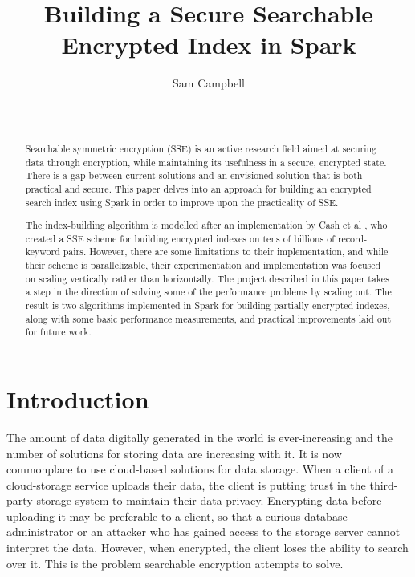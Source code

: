 \documentclass{sig-alternate-05-2015}
\begin{document}

\title{Building a Secure Searchable Encrypted Index in Spark}
\author{
\alignauthor
Sam Campbell\\
       \\
       \\
}


\maketitle
\begin{abstract}
Searchable symmetric encryption (SSE) is an active research field aimed at securing data through encryption, while maintaining its usefulness in a secure, encrypted state. There is a gap between current solutions and an envisioned solution that is both practical and secure. This paper delves into an approach for building an encrypted search index using Spark in order to improve upon the practicality of SSE.

The index-building algorithm is modelled after an implementation by Cash et al \cite{davidcashetal.2014}, who created a SSE scheme for building encrypted indexes on tens of billions of record-keyword pairs. However, there are some limitations to their implementation, and while their scheme is parallelizable, their experimentation and implementation was focused on scaling vertically rather than horizontally. The project described in this paper takes a step in the direction of solving some of the performance problems by scaling out. The result is two algorithms implemented in Spark for building partially encrypted indexes, along with some basic performance measurements, and practical improvements laid out for future work.
\end{abstract}


\section{Introduction}
The amount of data digitally generated in the world is ever-increasing and the number of solutions for storing data are increasing with it. It is now commonplace to use cloud-based solutions for data storage. When a client of a cloud-storage service uploads their data, the client is putting trust in the third-party storage system to maintain their data privacy. Encrypting data before uploading it may be preferable to a client, so that a curious database administrator or an attacker who has gained access to the storage server cannot interpret the data. However, when encrypted, the client loses the ability to search over it. This is the problem searchable encryption attempts to solve.
\end{document}
